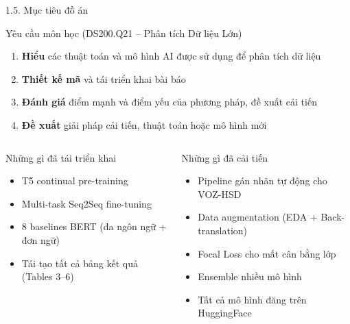 \documentclass[11pt, aspectratio=169]{beamer}
\begin{document}
\begin{frame}[fragile, shrink=8]{1.5. Mục tiêu đồ án}

\begin{block}{Yêu cầu môn học (DS200.Q21 -- Phân tích Dữ liệu Lớn)}
  \begin{enumerate}
    \item \textbf{Hiểu} các thuật toán và mô hình AI được sử dụng để phân tích dữ liệu
    \item \textbf{Thiết kế mã} và tái triển khai bài báo
    \item \textbf{Đánh giá} điểm mạnh và điểm yếu của phương pháp, đề xuất cải tiến
    \item \textbf{Đề xuất} giải pháp cải tiến, thuật toán hoặc mô hình mới
  \end{enumerate}
\end{block}

\vspace{0.3cm}
\begin{columns}[T]
  \begin{block}{Những gì đã tái triển khai}
    \begin{itemize}
      \item T5 continual pre-training
      \item Multi-task Seq2Seq fine-tuning
      \item 8 baselines BERT (đa ngôn ngữ + đơn ngữ)
      \item Tái tạo tất cả bảng kết quả (Tables 3--6)
    \end{itemize}
  \end{block}

  \begin{block}{Những gì đã cải tiến}
    \begin{itemize}
      \item Pipeline gán nhãn tự động cho VOZ-HSD
      \item Data augmentation (EDA + Back-translation)
      \item Focal Loss cho mất cân bằng lớp
      \item Ensemble nhiều mô hình
      \item Tất cả mô hình đăng trên HuggingFace
    \end{itemize}
  \end{block}
\end{columns}
\end{frame}
\end{document}
